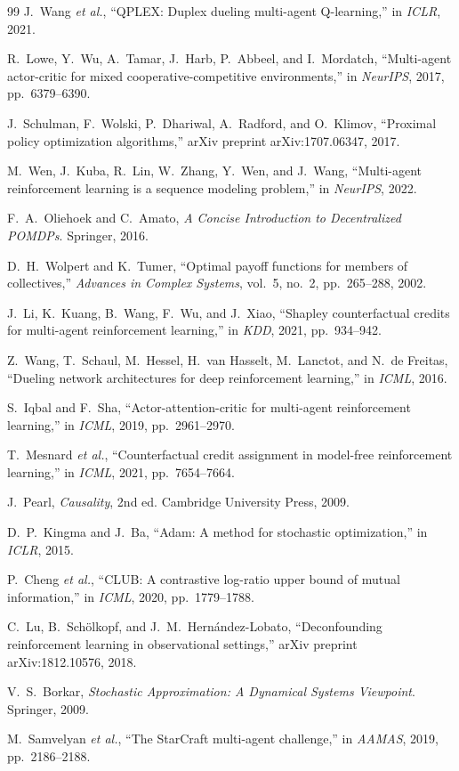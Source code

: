 \documentclass[journal]{IEEEtran}
\begin{document}
\begin{thebibliography}{99}
J.~Wang \emph{et al.},
``QPLEX: Duplex dueling multi-agent Q-learning,''
in \emph{ICLR}, 2021.

R.~Lowe, Y.~Wu, A.~Tamar, J.~Harb, P.~Abbeel, and I.~Mordatch,
``Multi-agent actor-critic for mixed cooperative-competitive environments,''
in \emph{NeurIPS}, 2017, pp.~6379--6390.

J.~Schulman, F.~Wolski, P.~Dhariwal, A.~Radford, and O.~Klimov,
``Proximal policy optimization algorithms,''
arXiv preprint arXiv:1707.06347, 2017.

M.~Wen, J.~Kuba, R.~Lin, W.~Zhang, Y.~Wen, and J.~Wang,
``Multi-agent reinforcement learning is a sequence modeling problem,''
in \emph{NeurIPS}, 2022.

F.~A.~Oliehoek and C.~Amato,
\emph{A Concise Introduction to Decentralized POMDPs}. Springer, 2016.

D.~H.~Wolpert and K.~Tumer,
``Optimal payoff functions for members of collectives,''
\emph{Advances in Complex Systems}, vol.~5, no.~2, pp.~265--288, 2002.

J.~Li, K.~Kuang, B.~Wang, F.~Wu, and J.~Xiao,
``Shapley counterfactual credits for multi-agent reinforcement learning,''
in \emph{KDD}, 2021, pp.~934--942.

Z.~Wang, T.~Schaul, M.~Hessel, H.~van Hasselt, M.~Lanctot, and N.~de Freitas,
``Dueling network architectures for deep reinforcement learning,''
in \emph{ICML}, 2016.

S.~Iqbal and F.~Sha,
``Actor-attention-critic for multi-agent reinforcement learning,''
in \emph{ICML}, 2019, pp.~2961--2970.

T.~Mesnard \emph{et al.},
``Counterfactual credit assignment in model-free reinforcement learning,''
in \emph{ICML}, 2021, pp.~7654--7664.

J.~Pearl,
\emph{Causality}, 2nd ed. Cambridge University Press, 2009.

D.~P.~Kingma and J.~Ba,
``Adam: A method for stochastic optimization,''
in \emph{ICLR}, 2015.

P.~Cheng \emph{et al.},
``CLUB: A contrastive log-ratio upper bound of mutual information,''
in \emph{ICML}, 2020, pp.~1779--1788.

C.~Lu, B.~Sch\"{o}lkopf, and J.~M.~Hern\'{a}ndez-Lobato,
``Deconfounding reinforcement learning in observational settings,''
arXiv preprint arXiv:1812.10576, 2018.

V.~S.~Borkar,
\emph{Stochastic Approximation: A Dynamical Systems Viewpoint}. Springer, 2009.

M.~Samvelyan \emph{et al.},
``The StarCraft multi-agent challenge,''
in \emph{AAMAS}, 2019, pp.~2186--2188.

\end{thebibliography}
\end{document}
